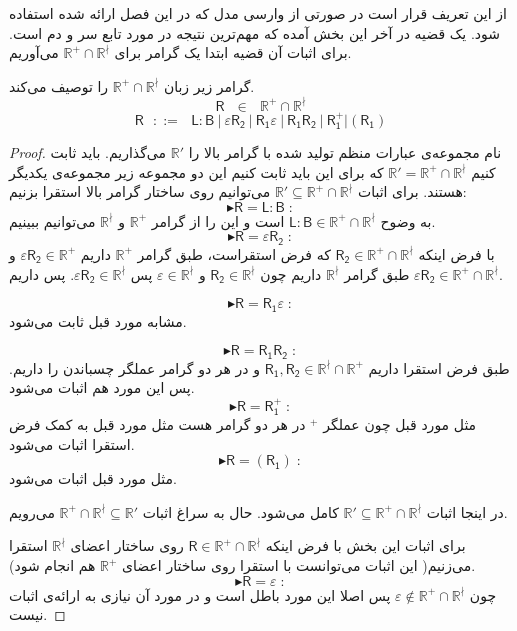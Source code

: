 از این تعریف قرار است در صورتی از وارسی مدل که در این فصل ارائه شده استفاده شود. یک قضیه در آخر این بخش آمده که مهم‌ترین نتیجه در مورد تابع سر و دم است. 
برای اثبات آن قضیه ابتدا یک گرامر برای $\mathbb{R^+ \cap R^\nmid}$ می‌آوریم.
\begin{thm}
	گرامر زیر زبان $\mathbb{R^+ \cap R^\nmid}$ را توصیف می‌کند.
	$$\mathsf{R} \:\:\:\in\:\:\: \mathbb{R^+ \cap R^\nmid}$$
	$$\mathsf{R}\:\:\: ::= \:\:\: \mathsf{L:B} \: |
	\: \mathsf{\varepsilon R_2} \: | \: \mathsf{R_1 \varepsilon} \: |
	\: \mathsf{R_1 R_2} \: | 
	\: \mathsf{R_1^+} | (\mathsf{R_1})$$
\end{thm}
\begin{proof}
	نام مجموعه‌ی عبارات منظم تولید شده با گرامر بالا را $\mathbb{R'}$ می‌گذاریم. باید ثابت کنیم
	$\mathbb{R'=R^+ \cap R^\nmid}$
	که برای این باید ثابت کنیم این دو مجموعه زیر مجموعه‌ی یکدیگر هستند. برای اثبات 
	$\mathbb{R' \subseteq R^+ \cap R^\nmid}$
	می‌توانیم روی ساختار گرامر بالا استقرا ‌بزنیم:
	$$\blacktriangleright \mathsf{R=L:B}\;:$$
	به وضوح 
	$\mathsf{L:B} \in \mathbb{R^+ \cap R^\nmid}$
	است و این را از گرامر $\mathbb{R^+}$ و $\mathbb{R^\nmid}$ می‌توانیم ببینیم.
	$$\blacktriangleright \mathsf{R=\varepsilon R_2}\;:$$
	با فرض اینکه 
	$\mathsf{R_2} \in \mathbb{R^+ \cap R^\nmid}$
	که فرض استقراست، طبق گرامر $\mathbb{R^+}$ داریم 	$\varepsilon\mathsf{R_2} \in \mathbb{R^+}$ و طبق گرامر $\mathbb{R^\nmid}$ داریم چون 
	$\mathsf{R_2} \in \mathbb{R^\nmid}$
	و
	$\varepsilon \in \mathbb{R^\nmid}$
	پس 
	$\mathsf{\varepsilon R_2} \in \mathbb{R^\nmid}$.
	پس داریم 
	$\mathsf{\varepsilon R_2} \in \mathbb{R^+ \cap R^\nmid}$.
	
	$$\blacktriangleright \mathsf{R=R_1 \varepsilon}\;:$$
	مشابه مورد قبل ثابت می‌شود.
	
	$$\blacktriangleright \mathsf{R=R_1 R_2}\;:$$
	طبق فرض استقرا داریم 
	$\mathsf{R_1,R_2} \in \mathbb{R^\nmid \cap R^+}$ 
	و در هر دو گرامر عملگر چسباندن را داریم. پس این مورد هم اثبات می‌شود.
	$$\blacktriangleright \mathsf{R=R_1^+}\;:$$
	مثل مورد قبل چون عملگر $ ^+$ در هر دو گرامر هست مثل مورد قبل به کمک فرض استقرا اثبات می‌شود.
	$$\blacktriangleright \mathsf{R=(R_1)}\;:$$
	مثل مورد قبل اثبات می‌شود.
	
	در اینجا اثبات 
	$\mathbb{R' \subseteq R^+ \cap R^\nmid}$ 
	کامل می‌شود. حال به سراغ اثبات 
	$\mathbb{R^+ \cap R^\nmid \subseteq R'}$
	می‌رویم.
	
	برای اثبات این بخش با فرض اینکه 
	$\mathsf{R} \in \mathbb{R^+ \cap R^\nmid}$
	روی ساختار اعضای $\mathbb{R^\nmid}$ استقرا می‌زنیم( این اثبات می‌توانست با استقرا روی ساختار اعضای $\mathbb{R^+}$ هم انجام شود).
	$$\blacktriangleright \mathsf{R=\varepsilon}\;:$$
	چون $\varepsilon \notin \mathbb{R^+ \cap R^\nmid}$ پس اصلا این مورد باطل است و در مورد آن نیازی به ارائه‌ی اثبات نیست.
	

\end{proof}
